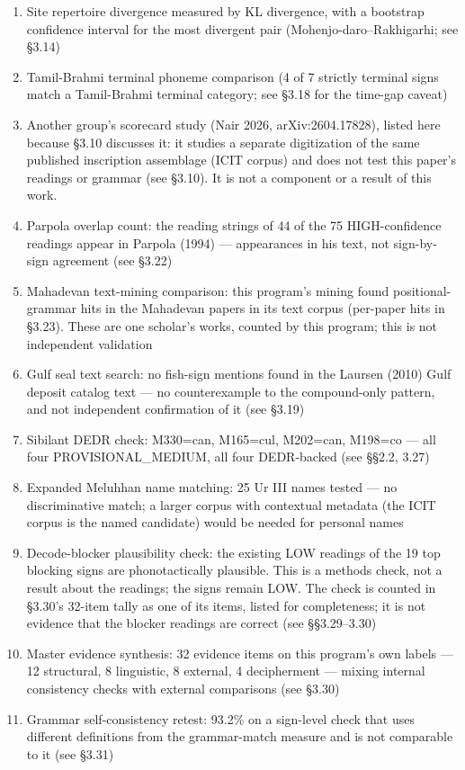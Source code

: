 \documentclass[11pt]{article}
\begin{document}
\begin{enumerate}
\item
  Site repertoire divergence measured by KL divergence, with a bootstrap confidence interval for the most divergent pair (Mohenjo-daro--Rakhigarhi; see §3.14)
\item
  Tamil-Brahmi terminal phoneme comparison (4 of 7 strictly terminal signs match a Tamil-Brahmi terminal category; see §3.18 for the time-gap caveat)
\item
  Another group's scorecard study (Nair 2026, arXiv:2604.17828), listed here because §3.10 discusses it: it studies a separate digitization of the same published inscription assemblage (ICIT corpus) and does not test this paper's readings or grammar (see §3.10). It is not a component or a result of this work.
\item
  Parpola overlap count: the reading strings of 44 of the 75 HIGH-confidence readings appear in Parpola (1994) --- appearances in his text, not sign-by-sign agreement (see §3.22)
\item
  Mahadevan text-mining comparison: this program's mining found positional-grammar hits in the Mahadevan papers in its text corpus (per-paper hits in §3.23). These are one scholar's works, counted by this program; this is not independent validation
\item
  Gulf seal text search: no fish-sign mentions found in the Laursen (2010) Gulf deposit catalog text --- no counterexample to the compound-only pattern, and not independent confirmation of it (see §3.19)
\item
  Sibilant DEDR check: M330=can, M165=cul, M202=can, M198=co --- all four PROVISIONAL\_MEDIUM, all four DEDR-backed (see §§2.2, 3.27)
\item
  Expanded Meluhhan name matching: 25 Ur III names tested
  --- no discriminative match; a larger corpus with contextual metadata
  (the ICIT corpus is the named candidate) would be needed for personal
  names
\item
  Decode-blocker plausibility check: the existing LOW readings of the 19 top blocking signs are phonotactically plausible. This is a methods check, not a result about the readings; the signs remain LOW. The check is counted in §3.30's 32-item tally as one of its items, listed for completeness; it is not evidence that the blocker readings are correct (see §§3.29--3.30)
\item
  Master evidence synthesis: 32 evidence items on this program's own labels --- 12 structural, 8 linguistic, 8 external, 4 decipherment --- mixing internal consistency checks with external comparisons (see §3.30)
\item
  Grammar self-consistency retest: 93.2\% on a sign-level check that uses different definitions from the grammar-match measure and is not comparable to it (see §3.31)
\end{enumerate}
\end{document}
